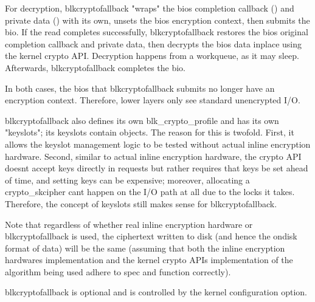 \documentclass[a4paper,11pt,english]{sphinxmanual}
\begin{document}
For decryption, blk\sphinxhyphen{}crypto\sphinxhyphen{}fallback "wraps" the bio\textquotesingle{}s completion callback
() and private data () with its own, unsets the
bio\textquotesingle{}s encryption context, then submits the bio.  If the read completes
successfully, blk\sphinxhyphen{}crypto\sphinxhyphen{}fallback restores the bio\textquotesingle{}s original completion
callback and private data, then decrypts the bio\textquotesingle{}s data in\sphinxhyphen{}place using the
kernel crypto API.  Decryption happens from a workqueue, as it may sleep.
Afterwards, blk\sphinxhyphen{}crypto\sphinxhyphen{}fallback completes the bio.

In both cases, the bios that blk\sphinxhyphen{}crypto\sphinxhyphen{}fallback submits no longer have an
encryption context.  Therefore, lower layers only see standard unencrypted I/O.

blk\sphinxhyphen{}crypto\sphinxhyphen{}fallback also defines its own blk\_crypto\_profile and has its own
"keyslots"; its keyslots contain  objects.  The reason
for this is twofold.  First, it allows the keyslot management logic to be tested
without actual inline encryption hardware.  Second, similar to actual inline
encryption hardware, the crypto API doesn\textquotesingle{}t accept keys directly in requests but
rather requires that keys be set ahead of time, and setting keys can be
expensive; moreover, allocating a crypto\_skcipher can\textquotesingle{}t happen on the I/O path
at all due to the locks it takes.  Therefore, the concept of keyslots still
makes sense for blk\sphinxhyphen{}crypto\sphinxhyphen{}fallback.

Note that regardless of whether real inline encryption hardware or
blk\sphinxhyphen{}crypto\sphinxhyphen{}fallback is used, the ciphertext written to disk (and hence the
on\sphinxhyphen{}disk format of data) will be the same (assuming that both the inline
encryption hardware\textquotesingle{}s implementation and the kernel crypto API\textquotesingle{}s implementation
of the algorithm being used adhere to spec and function correctly).

blk\sphinxhyphen{}crypto\sphinxhyphen{}fallback is optional and is controlled by the
 kernel configuration option.
\end{document}
